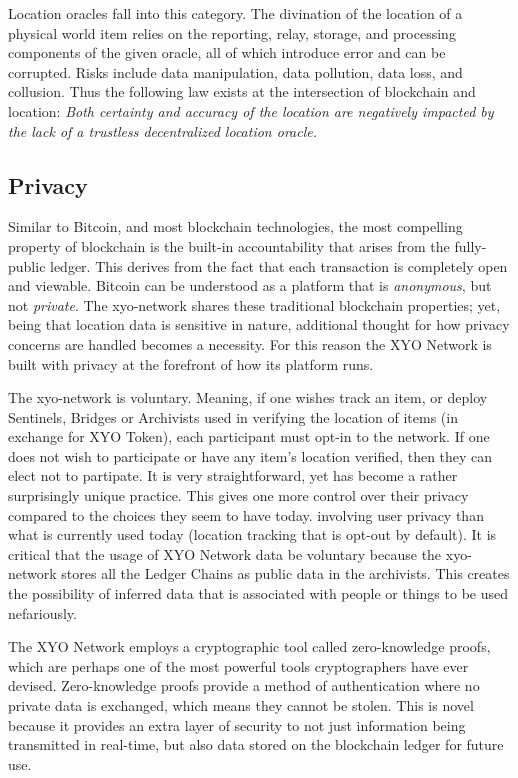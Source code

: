 \documentclass{article}
\begin{document}
Location oracles fall into this category. The divination of the location of a physical world item relies on the reporting, relay, storage, and processing components of the given oracle, all of which introduce error and can be corrupted. Risks include data manipulation, data pollution, data loss, and collusion. Thus the following law exists at the intersection of blockchain and location: \textit{Both \gls{certainty} and \gls{accuracy} of the location are negatively impacted by the lack of a trustless decentralized location oracle.}

\subsection{Privacy}

Similar to Bitcoin, and most blockchain technologies, the most compelling property of blockchain is the built-in accountability that arises from the fully-public ledger. This derives from the fact that each transaction is completely open and viewable. Bitcoin can be understood as a platform that is \textit{anonymous}, but not \textit{private}. The \Gls{xyo-network} shares these traditional blockchain properties; yet, being that location data is sensitive in nature, additional thought for how privacy concerns are handled becomes a necessity. For this reason the XYO Network is built with privacy at the forefront of how its platform runs.

The \Gls{xyo-network} is voluntary. Meaning, if one wishes track an item, or deploy Sentinels, Bridges or Archivists used in verifying the location of items (in exchange for XYO Token), each participant must opt-in to the network. If one does not wish to participate or have any item's location verified, then they can elect not to partipate. It is very straightforward, yet has become a rather surprisingly unique practice.  This gives one more control over their privacy compared to the choices they seem to have today. involving user privacy than what is currently used today (location tracking that is opt-out by default). It is critical that the usage of XYO Network data be voluntary because the \Gls{xyo-network} stores all the Ledger Chains as public data in the \Glspl{archivist}. This creates the possibility of inferred data that is associated with people or things to be used nefariously.

The XYO Network employs a cryptographic tool called zero-knowledge proofs, which are perhaps one of the most powerful tools cryptographers have ever devised. Zero-knowledge proofs provide a method of authentication where no private data is exchanged, which means they cannot be stolen. This is novel because it provides an extra layer of security to not just information being transmitted in real-time, but also data stored on the blockchain ledger for future use.
\end{document}
